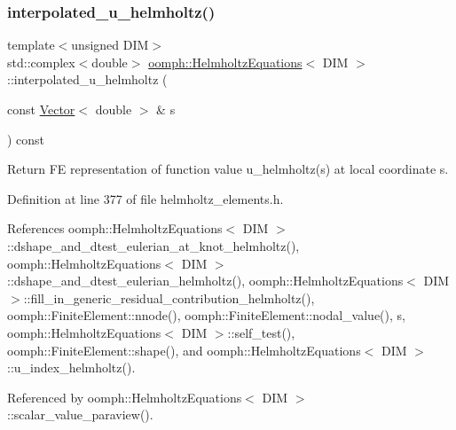 \mbox{\label{classoomph_1_1HelmholtzEquations_a935e41d545053199a77f7b9f494c9a5b}} 
\subsubsection{\texorpdfstring{interpolated\+\_\+u\+\_\+helmholtz()}{interpolated\_u\_helmholtz()}}
{\footnotesize\ttfamily template$<$unsigned D\+IM$>$ \\
std\+::complex$<$double$>$ \hyperlink{classoomph_1_1HelmholtzEquations}{oomph\+::\+Helmholtz\+Equations}$<$ D\+IM $>$\+::interpolated\+\_\+u\+\_\+helmholtz (\begin{DoxyParamCaption}\item[{const \hyperlink{classoomph_1_1Vector}{Vector}$<$ double $>$ \&}]{s }\end{DoxyParamCaption}) const\hspace{0.3cm}{\ttfamily [inline]}}



Return FE representation of function value u\+\_\+helmholtz(s) at local coordinate s. 



Definition at line 377 of file helmholtz\+\_\+elements.\+h.



References oomph\+::\+Helmholtz\+Equations$<$ D\+I\+M $>$\+::dshape\+\_\+and\+\_\+dtest\+\_\+eulerian\+\_\+at\+\_\+knot\+\_\+helmholtz(), oomph\+::\+Helmholtz\+Equations$<$ D\+I\+M $>$\+::dshape\+\_\+and\+\_\+dtest\+\_\+eulerian\+\_\+helmholtz(), oomph\+::\+Helmholtz\+Equations$<$ D\+I\+M $>$\+::fill\+\_\+in\+\_\+generic\+\_\+residual\+\_\+contribution\+\_\+helmholtz(), oomph\+::\+Finite\+Element\+::nnode(), oomph\+::\+Finite\+Element\+::nodal\+\_\+value(), s, oomph\+::\+Helmholtz\+Equations$<$ D\+I\+M $>$\+::self\+\_\+test(), oomph\+::\+Finite\+Element\+::shape(), and oomph\+::\+Helmholtz\+Equations$<$ D\+I\+M $>$\+::u\+\_\+index\+\_\+helmholtz().



Referenced by oomph\+::\+Helmholtz\+Equations$<$ D\+I\+M $>$\+::scalar\+\_\+value\+\_\+paraview().

\mbox{\label{classoomph_1_1HelmholtzEquations_ac502eaf1215845644e6101825397601c}} 
